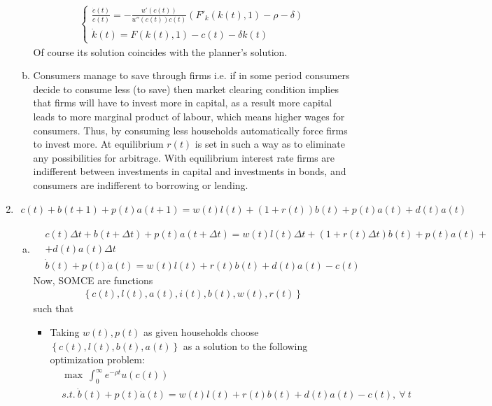 \documentclass[a4paper]{article}
\begin{document}
\begin{enumerate}[1.]
\begin{enumerate}[(a)]
	\begin{align*}
	\begin{cases}
	\frac{\dot{c}(t)}{c(t)} = -\frac{u'(c(t))}{u''(c(t))c(t)}(F'_k(k(t), 1) - \rho - \delta)\\
	\dot{k}(t) = F(k(t), 1) - c(t) - \delta k(t)
	\end{cases}
	\end{align*}	
	Of course its solution coincides with the planner's solution.
	\item Consumers manage to save through firms i.e. if in some period consumers decide to consume less (to save) then market clearing condition implies that firms will have to invest more in capital, as a result more capital leads to more marginal product of labour, which means higher wages for consumers. Thus, by consuming less households automatically force firms to invest more. At equilibrium $r(t)$ is set in such a way as to eliminate any possibilities for arbitrage. With equilibrium interest rate firms are indifferent between investments in capital and investments in bonds, and consumers are indifferent to borrowing or lending.
	\end{enumerate}
	\item 
	\begin{align*}
	c(t) + b(t + 1) + p(t) a(t + 1) = w(t)l(t) + (1 + r (t)) b(t) + p(t) a(t) + d(t)a(t)
	\end{align*}
	\begin{enumerate}[(a)]
		\item 
		\begin{align*}
		&c(t)\Delta t + b(t + \Delta t) + p(t)a(t + \Delta t) = w(t)l(t)\Delta t + (1 + r(t)\Delta t)b(t) + p(t)a(t) + \\
		&+d(t)a(t)\Delta t\\
		&\dot{b}(t) + p(t)\dot{a}(t) = w(t)l(t) + r(t)b(t) + d(t)a(t) - c(t)
		\end{align*}
		Now, SOMCE are functions
		\begin{align*}
		\left\{c(t), l(t), a(t), i(t), b(t), w(t), r(t)\right\}
		\end{align*}
		such that
		\begin{itemize}
			\item Taking $w(t), p(t)$ as given households choose $\left\{c(t), l(t), b(t), a(t)\right\}$ as a solution to the following optimization problem:
			\begin{align*}
			&\max\ \int_{0}^{\infty} e^{-\rho t}u(c(t))\\
			&s.t.\ \dot{b}(t) + p(t)\dot{a}(t) = w(t)l(t) + r(t)b(t) + d(t)a(t) - c(t),\ \forall\ t\\

\end{align*}
\end{itemize}
\end{enumerate}
\end{enumerate}
\end{document}
